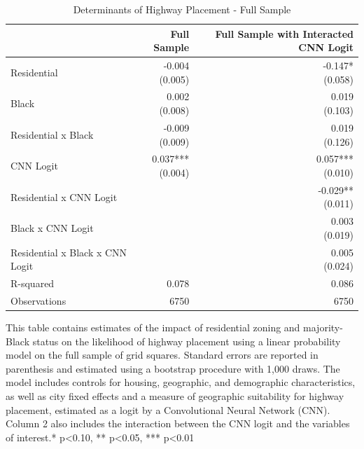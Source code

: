 \begin{table}[h]
\centering
\caption{Determinants of Highway Placement - Full Sample}
\label{tab:full_sample_results}
\begin{threeparttable}
\begin{tabular*}{1.0\textwidth}{@{\extracolsep{\fill}}l*{2}{r}}
\toprule
 & Full Sample & Full Sample with Interacted CNN Logit \\
\midrule
Residential & \makecell[tr]{-0.004 \\ (0.005)} & \makecell[tr]{-0.147{*} \\ (0.058)} \\
Black & \makecell[tr]{0.002 \\ (0.008)} & \makecell[tr]{0.019 \\ (0.103)} \\
Residential x Black & \makecell[tr]{-0.009 \\ (0.009)} & \makecell[tr]{0.019 \\ (0.126)} \\
CNN Logit & \makecell[tr]{0.037{***} \\ (0.004)} & \makecell[tr]{0.057{***} \\ (0.010)} \\
Residential x CNN Logit &  & \makecell[tr]{-0.029{**} \\ (0.011)} \\
Black x CNN Logit &  & \makecell[tr]{0.003 \\ (0.019)} \\
Residential x Black x CNN Logit &  & \makecell[tr]{0.005 \\ (0.024)} \\
R-squared & 0.078 & 0.086 \\
Observations & 6750 & 6750 \\
\bottomrule
\end{tabular*}
\begin{tablenotes}[flushleft]
\footnotesize
\item This table contains estimates of the impact of residential zoning and majority-Black status on the likelihood of highway placement using a linear probability model on the full sample of grid squares. Standard errors are reported in parenthesis and estimated using a bootstrap procedure with 1,000 draws. The model includes controls for housing, geographic, and demographic characteristics, as well as city fixed effects and a measure of geographic suitability for highway placement, estimated as a logit by a Convolutional Neural Network (CNN). Column 2 also includes the interaction between the CNN logit and the variables of interest.* p<0.10, ** p<0.05, *** p<0.01
\end{tablenotes}
\end{threeparttable}
\end{table}
